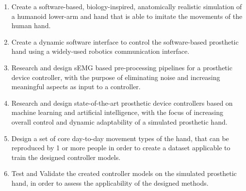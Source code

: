 \documentclass[../main.tex]{subfiles}
\begin{document}
\begin{enumerate}
\item Create a software-based, biology-inspired, anatomically realistic simulation of a humanoid lower-arm and hand that is able to imitate the movements of the human hand.
\item Create a dynamic software interface to control the software-based prosthetic hand using a widely-used robotics communication interface.
\item Research and design sEMG based pre-processing pipelines for a prosthetic device controller, with the purpose of eliminating noise and increasing meaningful aspects as input to a controller. 
\item Research and design state-of-the-art prosthetic device controllers based on machine learning and artificial intelligence, with the focus of increasing overall control and dynamic adaptability of a simulated prosthetic hand.
\item Design a set of core day-to-day movement types of the hand, that can be reproduced by 1 or more people in order to create a dataset applicable to train the designed controller models.
\item Test and Validate the created controller models on the simulated prosthetic hand, in order to assess the applicability of the designed methods.
\end{enumerate}
\end{document}
